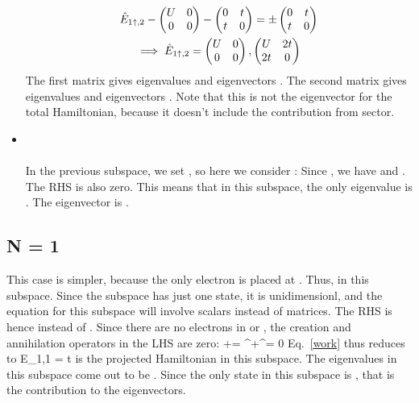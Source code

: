 \documentclass[12pt]{article}
\begin{document}
\begin{itemize}
\begin{gather}
\hat E_{1\uparrow,2} - \begin{pmatrix} U & 0 \\ 0 & 0 \end{pmatrix} - \begin{pmatrix}0 & t \\ t & 0 \end{pmatrix} = \pm \begin{pmatrix} 0 & t \\ t & 0 \end{pmatrix}\\
\implies \hat E_{1\uparrow,2} = \begin{pmatrix} U & 0  \\ 0 & 0 \end{pmatrix} , \begin{pmatrix} U & 2t \\ 2t & 0 \end{pmatrix}
\end{gather}
The first matrix gives eigenvalues  and eigenvectors . The second matrix gives eigenvalues  and eigenvectors . Note that this is not the eigenvector for the total Hamiltonian, because it doesn't include the contribution from  sector.
\item {} \\\\
In the previous subspace, we set , so here we consider :
Since , we have  and . The RHS is also zero. This means that in this subspace, the only eigenvalue is . The eigenvector is \il{\ket{\ua,\ua}}.
\end{itemize}

\subsection{N = 1}
This case is simpler, because the only electron is placed at \il{\na}. Thus,  in this subspace. Since the subspace has just one state, it is unidimensionl, and the equation for this subspace will involve scalars instead of matrices. The RHS is hence  instead of . Since there are no electrons in \il{\nb} or \il{\nd}, the creation and annihilation operators in the LHS are zero:
\beq
\na\nb+\nc\nd = \cb^\dagger\ce+\ce^\dagger\cb = 0
\eeq
Eq.~\ref{work} thus reduces to
\beq[En1]
\hat E_{1\ua,1} = \pm t
\eeq
{} is the projected Hamiltonian in this subspace. The eigenvalues in this subspace come out to be . Since the only state in this subspace is , that is the contribution to the eigenvectors.
\end{document}
